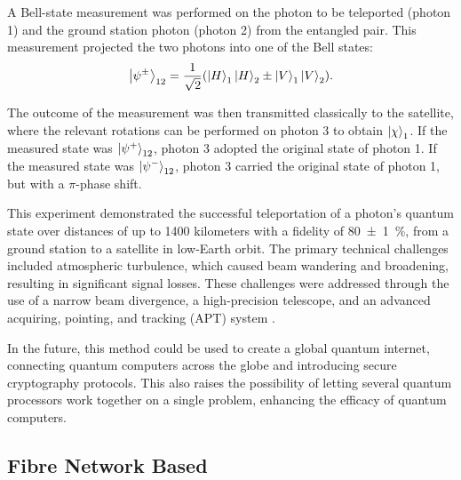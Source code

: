 A Bell-state measurement was performed on the photon to be teleported (photon 1) and the ground station photon (photon 2) from the entangled pair. This measurement projected the two photons into one of the Bell states:
\begin{equation}
    \ket{\psi^{\pm}}_{12} = \frac{1}{\sqrt{2}} (\ket{H}_1\ket{H}_2 \pm \ket{V}_1\ket{V}_2).
\end{equation}

The outcome of the measurement was then transmitted classically to the satellite, where the relevant rotations can be performed on photon 3 to obtain $\ket{\chi}_1$. If the measured state was \(\ket{\psi^{+}}_{12}\), photon 3 adopted the original state of photon 1. If the measured state was \(\ket{\psi^{-}}_{12}\), photon 3 carried the original state of photon 1, but with a \(\pi\)-phase shift.  

This experiment demonstrated the successful teleportation of a photon's quantum state over distances of up to 1400 kilometers with a fidelity of \SI{80(1)}{\percent}, from a ground station to a satellite in low-Earth orbit. The primary technical challenges included atmospheric turbulence, which caused beam wandering and broadening, resulting in significant signal losses. These challenges were addressed through the use of a narrow beam divergence, a high-precision telescope, and an advanced acquiring, pointing, and tracking (APT) system \cite{Ren:2017}.

In the future, this method could be used to create a global quantum internet, connecting quantum computers across the globe and introducing secure cryptography protocols. This also raises the possibility of letting several quantum processors work together on a single problem, enhancing the efficacy of quantum computers.

\subsection{Fibre Network Based}



